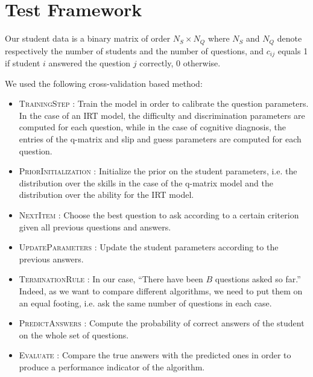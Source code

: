 \documentclass{sig-alternate}
\begin{document}


\section{Test Framework}

Our student data is a binary matrix of order $N_S \times N_Q$ where $N_S$ and $N_Q$ denote respectively the number of students and the number of questions, and $c_{ij}$ equals 1 if student $i$ answered the question $j$ correctly, 0 otherwise. 

We used the following cross-validation based method: 

\begin{itemize}
\item \textsc{TrainingStep} : Train the model in order to calibrate the question parameters. In the case of an IRT model, the difficulty and discrimination parameters are computed for each question, while in the case of cognitive diagnosis, the entries of the q-matrix and slip and guess parameters are computed for each question.
\item \textsc{PriorInitialization} : Initialize the prior on the student parameters, i.e. the distribution over the skills in the case of the q-matrix model and the distribution over the ability for the IRT model. 
\item \textsc{NextItem} : Choose the best question to ask according to a certain criterion given all previous questions and answers. 
\item \textsc{UpdateParameters} : Update the student parameters according to the previous answers.
\item \textsc{TerminationRule} : In our case, ``There have been $B$ questions asked so far.'' Indeed, as we want to compare different algorithms, we need to put them on an equal footing, i.e. ask the same number of questions in each case.
\item \textsc{PredictAnswers} : Compute the probability of correct answers of the student on the whole set of questions.
\item \textsc{Evaluate} : Compare the true answers with the predicted ones in order to produce a performance indicator of the algorithm. 
\end{itemize}
\end{document}
